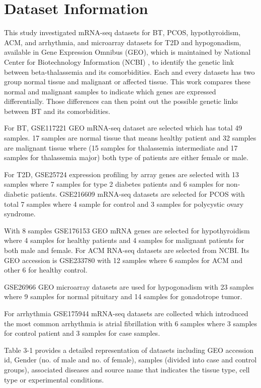 \section{Dataset Information}
\label{sec:sec3_2}

This study investigated mRNA-seq datasets for BT, PCOS, hypothyroidism, ACM, and arrhythmia, and microarray datasets for T2D and hypogonadism, available in Gene Expression Omnibus (GEO), which is maintained by National Center for Biotechnology Information (NCBI) \cite{b3}, to identify the genetic link between beta-thalassemia and its comorbidities. Each and every datasets has two group normal tissue and malignant or affected tissue. This work compares these normal and malignant samples to indicate which genes are expressed differentially. Those differences can then point out the possible genetic links between BT and its comorbidities.

For BT, GSE117221 GEO mRNA-seq dataset are selected which has total 49 samples. 17 samples are normal tissue that means healthy patient and 32 samples are malignant tissue where (15 samples for thalassemia intermediate and 17 samples for thalassemia major) both type of patients are either female or male. 

For T2D, GSE25724 expression profiling by array genes are selected with 13 samples where 7 samples for type 2 diabetes patients and 6 samples for non-diabetic patients. 
GSE216609 mRNA-seq datasets are selected for PCOS with total 7 samples where 4 sample for control and 3 samples for polycystic ovary syndrome.

With 8 samples GSE176153 GEO mRNA genes are selected for hypothyroidism where 4 samples for healthy patients and 4 samples for malignant patients for both male and female. 
For ACM RNA-seq datasets are selected from NCBI. Its GEO accession is GSE233780 with 12 samples where 6 samples for ACM and other 6 for healthy control. 

GSE26966 GEO microarray datasets are used for hypogonadism with 23 samples where 9 samples for normal pituitary and 14 samples for gonadotrope tumor. 

For arrhythmia GSE175944 mRNA-seq datasets are collected which introduced the most common arrhythmia is atrial fibrillation with 6 samples where 3 samples for control patient and 3 samples for case samples. 

Table 3-1 provides a detailed representation of datasets including GEO accession id, Gender (no. of male and no. of female), samples (divided into case and control groups), associated diseases and source name that indicates the tissue type, cell type or experimental conditions.


